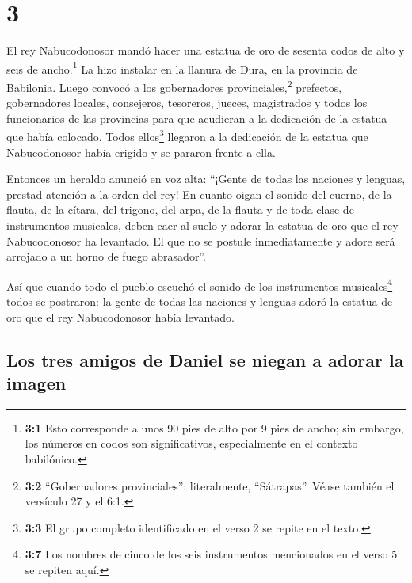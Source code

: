 \hypertarget{section-2}{%
\section{3}\label{section-2}}

 El rey Nabucodonosor mandó hacer una estatua de oro de
sesenta codos de alto y seis de ancho.\footnote{\textbf{3:1} Esto
  corresponde a unos 90 pies de alto por 9 pies de ancho; sin embargo,
  los números en codos son significativos, especialmente en el contexto
  babilónico.} La hizo instalar en la llanura de Dura, en la provincia
de Babilonia.  Luego convocó a los gobernadores
provinciales,\footnote{\textbf{3:2} ``Gobernadores provinciales'':
  literalmente, ``Sátrapas''. Véase también el versículo 27 y el 6:1.}
prefectos, gobernadores locales, consejeros, tesoreros, jueces,
magistrados y todos los funcionarios de las provincias para que
acudieran a la dedicación de la estatua que había colocado.
 Todos ellos\footnote{\textbf{3:3} El grupo completo
  identificado en el verso 2 se repite en el texto.} llegaron a la
dedicación de la estatua que Nabucodonosor había erigido y se pararon
frente a ella.

 Entonces un heraldo anunció en voz alta: ``¡Gente de
todas las naciones y lenguas, prestad atención a la orden del rey!
 En cuanto oigan el sonido del cuerno, de la flauta, de la
cítara, del trigono, del arpa, de la flauta y de toda clase de
instrumentos musicales, deben caer al suelo y adorar la estatua de oro
que el rey Nabucodonosor ha levantado.  El que no se
postule inmediatamente y adore será arrojado a un horno de fuego
abrasador''.

 Así que cuando todo el pueblo escuchó el sonido de los
instrumentos musicales\footnote{\textbf{3:7} Los nombres de cinco de los
  seis instrumentos mencionados en el verso 5 se repiten aquí.} todos se
postraron: la gente de todas las naciones y lenguas adoró la estatua de
oro que el rey Nabucodonosor había levantado.

\hypertarget{los-tres-amigos-de-daniel-se-niegan-a-adorar-la-imagen}{%
\subsection{Los tres amigos de Daniel se niegan a adorar la
imagen}\label{los-tres-amigos-de-daniel-se-niegan-a-adorar-la-imagen}}

